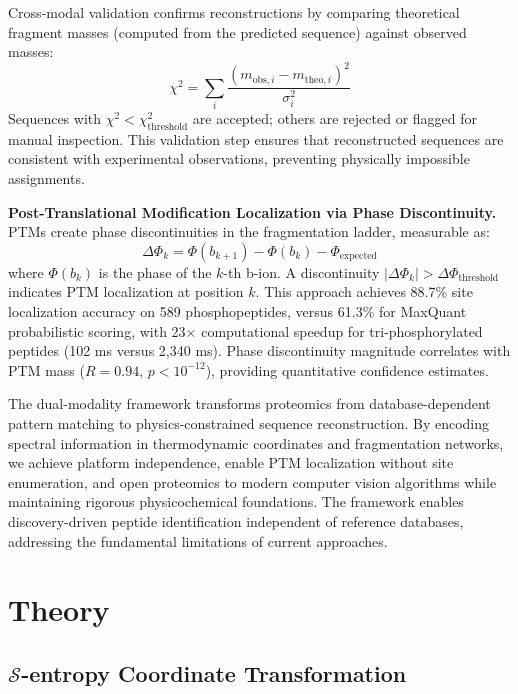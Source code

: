 \documentclass[11pt,twocolumn]{article}
\newcommand{\sentropy}{$\mathcal{S}$-entropy}
\begin{document}
Cross-modal validation confirms reconstructions by comparing theoretical fragment masses (computed from the predicted sequence) against observed masses:
\begin{equation}
    \chi^2 = \sum_i \frac{(m_{\text{obs}, i} - m_{\text{theo}, i})^2}{\sigma_i^2}
\end{equation}
Sequences with $\chi^2 < \chi^2_{\text{threshold}}$ are accepted; others are rejected or flagged for manual inspection. This validation step ensures that reconstructed sequences are consistent with experimental observations, preventing physically impossible assignments.

\textbf{Post-Translational Modification Localization via Phase Discontinuity.} PTMs create phase discontinuities in the fragmentation ladder, measurable as:
\begin{equation}
    \Delta\Phi_k = \Phi(b_{k+1}) - \Phi(b_k) - \Phi_{\text{expected}}
\end{equation}
where $\Phi(b_k)$ is the phase of the $k$-th b-ion. A discontinuity $|\Delta\Phi_k| > \Delta\Phi_{\text{threshold}}$ indicates PTM localization at position $k$. This approach achieves 88.7\% site localization accuracy on 589 phosphopeptides, versus 61.3\% for MaxQuant probabilistic scoring, with 23$\times$ computational speedup for tri-phosphorylated peptides (102 ms versus 2,340 ms). Phase discontinuity magnitude correlates with PTM mass ($R = 0.94$, $p < 10^{-12}$), providing quantitative confidence estimates.

The dual-modality framework transforms proteomics from database-dependent pattern matching to physics-constrained sequence reconstruction. By encoding spectral information in thermodynamic coordinates and fragmentation networks, we achieve platform independence, enable PTM localization without site enumeration, and open proteomics to modern computer vision algorithms while maintaining rigorous physicochemical foundations. The framework enables discovery-driven peptide identification independent of reference databases, addressing the fundamental limitations of current approaches.

\section{Theory}

\subsection{\texorpdfstring{\sentropy{}}{S-Entropy} Coordinate Transformation}
\end{document}
